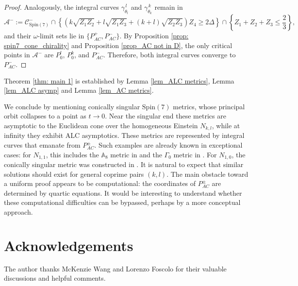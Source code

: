 \documentclass[11pt,letterpaper]{amsart}
\theoremstyle{definition}
\numberwithin{equation}{section}
\newcommand{\spin}{\mathrm{Spin}}
\begin{document}
\begin{proof}
Analogously, the integral curves $\gamma_{\theta_l}^{\,l}$ and $\gamma_{\theta_k}^{\,k}$ remain in
$$
\mathcal{A}^-:=\mathcal{C}_{\spin(7)}^-\cap \left\{\left(k\sqrt{Z_1Z_2}+l\sqrt{Z_1Z_3}+(k+l)\sqrt{Z_2Z_3}\right)Z_4\geq 2\Delta\right\}\cap \left\{Z_1+Z_2+Z_3\leq \frac{2}{3}\right\},
$$ 
and their $\omega$-limit sets lie in $\{P_{AC}^+,P_{AC}^-\}$.
By Proposition \ref{prop: spin7_cone_chirality} and Proposition \ref{prop_AC not in D},
the only critical points in $\mathcal{A}^-$ are $P_0^l$, $P_0^k$, and $P_{AC}^-$.  Therefore, both integral curves converge to $P_{AC}^-$.
\end{proof}

Theorem \ref{thm: main 1} is established by Lemma \ref{lem_ALC metrics}, Lemma \ref{lem_ALC asymp} and Lemma \ref{lem_AC metrics}.

We conclude by mentioning conically singular $\spin(7)$ metrics, whose principal orbit collapses to a point as $t\to 0$. Near the singular end these metrics are asymptotic to the Euclidean cone over the homogeneous Einstein $N_{k,l}$, while at infinity they exhibit ALC asymptotics. These metrics are represented by integral curves that emanate from $P_{AC}^\pm$. Such examples are already known in exceptional cases: for $N_{1,1}$, this includes the $\mathbb{A}_8$ metric in \cite{cvetic_cohomogeneity_2002} and the $\Gamma_0$ metric in \cite[Theorem 1.3]{chi_einstein_2020}. For $N_{1,0}$, the conically singular metric was constructed in \cite{lehmann2022geometric}. It is natural to expect that similar solutions should exist for general coprime pairs $(k,l)$. The main obstacle toward a uniform proof appears to be computational: the coordinates of $P_{AC}^\pm$ are determined by quartic equations. It would be interesting to understand whether these computational difficulties can be bypassed, perhaps by a more conceptual approach.

\section*{Acknowledgements}
The author thanks McKenzie Wang and Lorenzo Foscolo for their valuable discussions and helpful comments.

\end{document}
